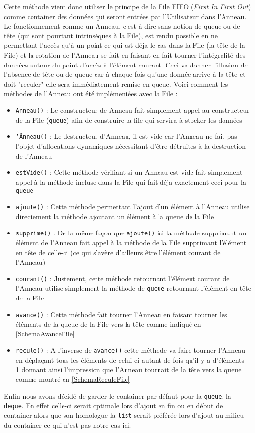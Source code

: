 \documentclass{article}
\newcommand{\info}{\texttt}
\begin{document}
        Cette méthode vient donc utiliser le principe de la File FIFO (\emph{First In First Out}) comme container des données qui seront entrées par l'Utilisateur dans l'Anneau. Le fonctionnement comme un Anneau, c'est à dire sans notion de queue ou de tête (qui sont pourtant intrinsèques à la File), est rendu possible en ne permettant l'accès qu'à un point ce qui est déja le cas dans la File (la tête de la File) et la rotation de l'Anneau se fait en faisant en fait tourner l'intégralité des données autour du point d'accès à l'élément courant. Ceci va donner l'illusion de l'absence de tête ou de queue car à chaque fois qu'une donnée arrive à la tête et doit "reculer" elle sera immédiatement remise en queue.
        Voici comment les méthodes de l'Anneau ont été implémentées avec la File :
        \begin{itemize}
            \item \info{Anneau()} : Le constructeur de Anneau fait simplement appel au constructeur de la File (\info{queue}) afin de construire la file qui servira à stocker les données
            \item \info{\info{\char`\~Anneau()}} : Le destructeur d'Anneau, il est vide car l'Anneau ne fait pas l'objet d'allocations dynamiques nécessitant d'être détruites à la destruction de l'Anneau
            \item \info{estVide()} : Cette méthode vérifiant si un Anneau est vide fait simplement appel à la méthode incluse dans la File qui fait déja exactement ceci pour la \info{queue}
            \item \info{ajoute()} : Cette méthode permettant l'ajout d'un élément à l'Anneau utilise directement la méthode ajoutant un élément à la queue de la File
            \item \info{supprime()} : De la même façon que \info{ajoute()} ici la méthode supprimant un élément de l'Anneau fait appel à la méthode de la File supprimant l'élément en tête de celle-ci (ce qui s'avère d'ailleurs être l'élément courant de l'Anneau)
            \item \info{courant()} : Justement, cette méthode retournant l'élément courant de l'Anneau utilise simplement la méthode de \info{queue} retournant l'élément en tête de la File
            \item \info{avance()} : Cette méthode fait tourner l'Anneau en faisant tourner les éléments de la queue de la File vers la tête comme indiqué en \ref{SchemaAvanceFile}
            \item \info{recule()} : A l'inverse de \info{avance()} cette méthode va faire tourner l'Anneau en déplaçant tous les éléments de celui-ci autant de fois qu'il y a d'éléments - 1 donnant ainsi l'impression que l'Anneau tournait de la tête vers la queue comme montré en \ref{SchemaReculeFile}
        \end{itemize}
        Enfin nous avons décidé de garder le container par défaut pour la \info{queue}, la \info{deque}. En effet celle-ci serait optimale lors d'ajout en fin ou en début de container alors que son homologue la \info{list} serait préférée lors d'ajout au milieu du container ce qui n'est pas notre cas ici.
        
\end{document}
